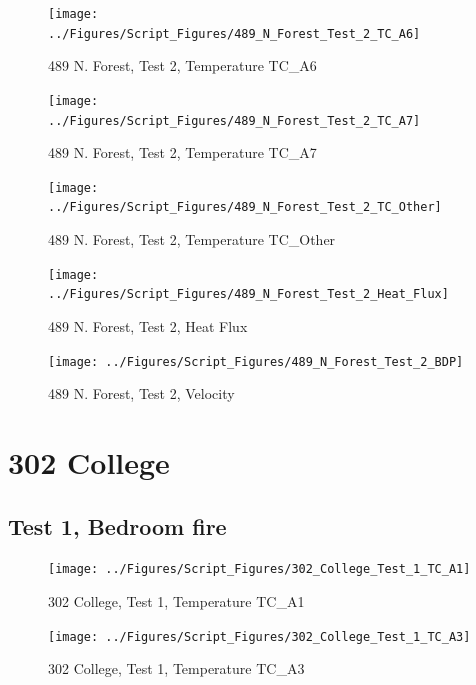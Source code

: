 \documentclass[12pt,oneside]{book}
\begin{document}
\begin{figure}[!ht]
\texttt{[image: ../Figures/Script\_Figures/489\_N\_Forest\_Test\_2\_TC\_A6]}
\caption{489 N. Forest, Test 2, Temperature TC\_A6}
\label{fig:489_N_Forest_Test_2_TC_A6}
\end{figure}

\begin{figure}[!ht]
\texttt{[image: ../Figures/Script\_Figures/489\_N\_Forest\_Test\_2\_TC\_A7]}
\caption{489 N. Forest, Test 2, Temperature TC\_A7}
\label{fig:489_N_Forest_Test_2_TC_A7}
\end{figure}

\begin{figure}[!ht]
\texttt{[image: ../Figures/Script\_Figures/489\_N\_Forest\_Test\_2\_TC\_Other]}
\caption{489 N. Forest, Test 2, Temperature TC\_Other}
\label{fig:489_N_Forest_Test_2_TC_Other}
\end{figure}

\begin{figure}[!ht]
\texttt{[image: ../Figures/Script\_Figures/489\_N\_Forest\_Test\_2\_Heat\_Flux]}
\caption{489 N. Forest, Test 2, Heat Flux}
\label{fig:489_N_Forest_Test_2_Heat_Flux}
\end{figure}

\begin{figure}[!ht]
\texttt{[image: ../Figures/Script\_Figures/489\_N\_Forest\_Test\_2\_BDP]}
\caption{489 N. Forest, Test 2, Velocity}
\label{fig:489_N_Forest_Test_2_BDP}
\end{figure}


\clearpage


\section{302 College}

\subsection{Test 1, Bedroom fire}

\begin{figure}[!ht]
\texttt{[image: ../Figures/Script\_Figures/302\_College\_Test\_1\_TC\_A1]}
\caption{302 College, Test 1, Temperature TC\_A1}
\label{fig:302_College_Test_1_TC_A1}
\end{figure}

\begin{figure}[!ht]
\texttt{[image: ../Figures/Script\_Figures/302\_College\_Test\_1\_TC\_A3]}
\caption{302 College, Test 1, Temperature TC\_A3}
\label{fig:302_College_Test_1_TC_A3}
\end{figure}
\end{document}
